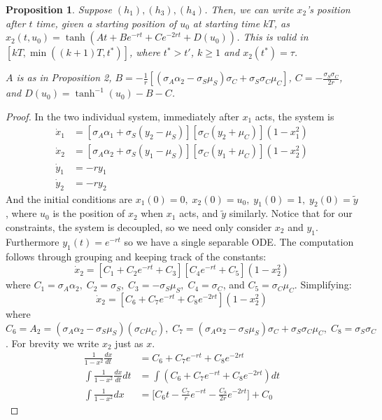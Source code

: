 \documentclass[preprint,12pt]{elsarticle}
\newcommand{\wt}{\widetilde}
\newtheorem{prop}{Proposition}
\begin{document}
\begin{prop}\label{Prop:explicitSolution}
    Suppose $(h_1), (h_3), (h_4)$. Then, we can write $x_2$'s position after $t$ time, given a starting position of $u_0$ at starting time $kT$, as $x_2(t, u_0) = \tanh(At+Be^{-rt} + Ce^{-2rt} + D(u_0))$. This is valid in $[kT, \min((k+1)T, t^*)]$, where $t^* > t'$, $k \geq 1$ and $x_2(t^*) = \tau$.

    $A$ is as in Proposition 2, $B=-\frac{1}{r}[(\sigma_A\alpha_2-\sigma_S\mu_S)\sigma_C+\sigma_S\sigma_C\mu_C]$, $C=-\frac{\sigma_S\sigma_C}{2r}$, and $D(u_0)=\tanh^{-1}(u_0)-B-C$.
\end{prop}
\begin{proof} In the two individual system, immediately after $x_1$ acts, the system is
\begin{equation}
    \begin{split}
        \dot{x}_1&=[\sigma_A\alpha_1+\sigma_S(y_2-\mu_S)][\sigma_C(y_2+\mu_C)](1-x_1^2)\\
        \dot{x}_2&=[\sigma_A\alpha_2+\sigma_S(y_1-\mu_S)][\sigma_C(y_1+\mu_C)](1-x_2^2)\\
        \dot y_1 &= -ry_1\\
        \dot y_2 &= -ry_2
    \end{split}
\end{equation}
And the initial conditions are $x_1(0)=0,\; x_2(0)= u_0,\; y_1(0)=1,\;y_2(0)= \wt y $, where $u_0$ is the position of $x_2$ when $x_1$ acts, and $\wt y$ similarly. Notice that for our constraints, the system is decoupled, so we need only consider $x_2$ and $y_1$. Furthermore $y_1(t)=e^{-rt}$ so we have a single separable ODE. The computation follows through grouping and keeping track of the constants:
\[\dot{x}_2=[C_1+C_2e^{-rt}+C_3][C_4e^{-rt}+C_5](1-x_2^2)\]
where $C_1=\sigma_A\alpha_2, \;C_2 = \sigma_S,\; C_3=-\sigma_S\mu_S,\; C_4=\sigma_C$, and $C_5=\sigma_C\mu_C$. Simplifying:
\[\dot x_2 = [C_6+C_7e^{-rt}+C_8e^{-2rt}](1-x_2^2)\]
where $C_6= A_2 = (\sigma_A\alpha_2-\sigma_S\mu_S)(\sigma_C\mu_C),\; C_7 = (\sigma_A\alpha_2-\sigma_S\mu_S)\sigma_C+ \sigma_S\sigma_C\mu_C,\; C_8=\sigma_S\sigma_C$. For brevity we write $x_2$ just as $x$.
\begin{equation*}
    \begin{split}
        \frac{1}{1-x^2}\frac{dx}{dt}&=C_6+C_7e^{-rt}+C_8e^{-2rt}\\
        \int\frac{1}{1-x^2}\frac{dx}{dt}dt&=\int(C_6+C_7e^{-rt}+C_8e^{-2rt})dt\\
        \int\frac{1}{1-x^2}{dx}&=\big[C_6t-\frac{C_7}{r}e^{-rt}-\frac{C_8}{2r}e^{-2rt}\big]+C_0

\end{split}
\end{equation*}
\end{proof}
\end{document}
